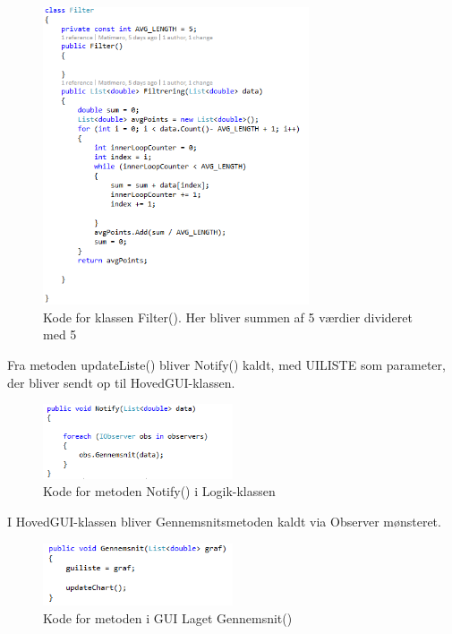 \begin{figure}[H]
	\centering
	\includegraphics[width=0.7\textwidth]{FigurerProgram/Filter}
	\caption{Kode for klassen Filter(). Her bliver summen af 5 værdier divideret med 5}
	\label{fig:Filter}
\end{figure}

Fra metoden updateListe() bliver Notify() kaldt, med UILISTE som parameter, der bliver sendt op til HovedGUI-klassen.

\begin{figure}[H]
	\centering
	\includegraphics[width=0.5\textwidth]{FigurerProgram/NotifyLogik}
	\caption{Kode for metoden Notify() i Logik-klassen}
	\label{fig:NotifyLogik}
\end{figure}

I HovedGUI-klassen bliver Gennemsnitsmetoden kaldt via Observer mønsteret.

\begin{figure}[H]
	\centering
	\includegraphics[width=0.5\textwidth]{FigurerProgram/GennemsnitGUI}
	\caption{Kode for metoden i GUI Laget Gennemsnit()}
	\label{fig:GennemsnitGUI}
\end{figure}

